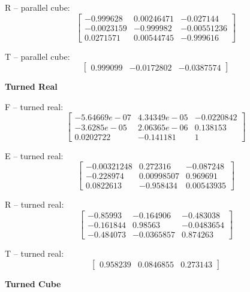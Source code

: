 \documentclass[10pt,a4paper]{article}
\begin{document}
R -- parallel cube: 
\begin{equation*}
\begin{bmatrix}
-0.999628 & 0.00246471 & -0.027144 \\ -0.0023159 & -0.999982 & -0.00551236 \\ 0.0271571 & 0.00544745 & -0.999616
\end{bmatrix}
\end{equation*}

T -- parallel cube: 
\begin{equation*}
\begin{bmatrix}
0.999099 & -0.0172802 & -0.0387574
\end{bmatrix}
\end{equation*}

\textbf{Turned Real}

F -- turned real: 
\begin{equation*}
\begin{bmatrix}
-5.64669e-07 & 4.34349e-05 & -0.0220842 \\ -3.6285e-05 & 2.06365e-06 & 0.138153 \\ 0.0202722 & -0.141181 & 1
\end{bmatrix}
\end{equation*}

E -- turned real: 
\begin{equation*}
\begin{bmatrix}
-0.00321248 & 0.272316 & -0.087248 \\ -0.228974 & 0.00998507 & 0.969691 \\ 0.0822613 & -0.958434 & 0.00543935
\end{bmatrix}
\end{equation*}

R -- turned real: 
\begin{equation*}
\begin{bmatrix}
-0.85993 & -0.164906 & -0.483038 \\ -0.161844 & 0.98563 & -0.0483654 \\ -0.484073 & -0.0365857 & 0.874263
\end{bmatrix}
\end{equation*}

T -- turned real: 
\begin{equation*}
\begin{bmatrix}
0.958239 & 0.0846855 & 0.273143
\end{bmatrix}
\end{equation*}

\textbf{Turned Cube}
\end{document}
